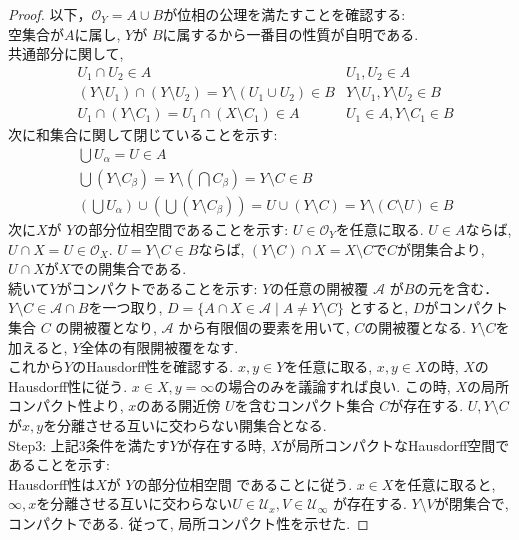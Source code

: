 \documentclass[lualatex]{ltjsbook}
\theoremstyle{remark}
\theoremstyle{plain}
\begin{document}
\begin{proof}
	 以下，$\mathcal{O}_Y = A \cup B$が位相の公理を満たすことを確認する:\\
	 空集合が$A$に属し,  $Y$が $B$に属するから一番目の性質が自明である.\\
	 共通部分に関して,
	 \begin{align*}
		& U_1 \cap U_2 \in A & U_1 , U_2 \in A \\
		& \left( Y \setminus U_1 \right) \cap \left( Y \setminus U_2 \right) = Y \setminus \left(U_1 \cup U_2  \right) \in B &Y\setminus U_1,Y\setminus U_2 \in B \\
		&U_1 \cap  \left( Y \setminus C_1 \right) = U_1  \cap \left( X \setminus C_1 \right) \in A & U_1 \in A , Y\setminus C_1 \in B 
	 \end{align*}
	 次に和集合に関して閉じていることを示す:
	 \begin{align*}
		& \bigcup U _{\alpha} = U \in A \\
		& \bigcup \left( Y \setminus C _{\beta} \right)  = Y \setminus \left( \bigcap C_{\beta}  \right) = Y \setminus C \in B  \\
		& \left( \bigcup U_{\alpha}  \right) \cup \left( \bigcup \left( Y \setminus C_{\beta} \right)   \right)  = U \cup (Y \setminus C) = Y \setminus \left( C \setminus U \right) \in B  
	 \end{align*}
	次に$X$が $Y$の部分位相空間であることを示す:  $U \in \mathcal{O}_Y$を任意に取る.
	$U \in  A$ならば, $U \cap X = U \in \mathcal{O}_X $. $U = Y \setminus C \in B$ならば, $\left( Y\setminus C \right) \cap X = X \setminus C $で$C$が閉集合より,  $U \cap X$が$X$での開集合である. \\
	続いて$Y$がコンパクトであることを示す:
	$Y$の任意の開被覆 $\mathcal{A}$ が$B$の元を含む． 
	$Y \setminus C \in \mathcal{A} \cap B$を一つ取り,  
	$D =\{ A \cap X \in \mathcal{A}  \mid A \neq Y \setminus C\} $ とすると, 
	$D$がコンパクト集合 $C$ の開被覆となり, 
	$\mathcal{A}$ から有限個の要素を用いて, $C$の開被覆となる.  
	$Y \setminus C$を加えると, $Y$全体の有限開被覆をなす.\\
	これから$Y$のHausdorff性を確認する.  $x, y \in Y$を任意に取る, $x, y \in X$の時, $X$のHausdorff性に従う.  $x \in X , y = \infty$の場合のみを議論すれば良い. この時, $X$の局所コンパクト性より,  $x$のある開近傍 $U$を含むコンパクト集合 $C$が存在する.  $U , Y \setminus C$が$x,y$を分離させる互いに交わらない開集合となる.\\
	Step3: 上記3条件を満たす$Y$が存在する時,  $X$が局所コンパクトなHausdorff空間であることを示す:\\
	Hausdorff性は$X$が $Y$の部分位相空間 であることに従う. $x \in X$を任意に取ると, $\infty ,x$を分離させる互いに交わらない$U \in \mathcal{U}_x, V \in \mathcal{U}_{\infty}$ が存在する. $Y \setminus V$が閉集合で, コンパクトである. 従って, 局所コンパクト性を示せた.
	

\end{proof}
\end{document}
